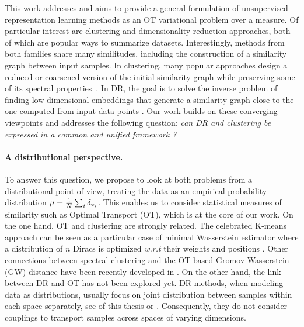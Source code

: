 This work addresses  and aims to provide a general formulation of unsupervised representation learning methods as an OT variational problem over a measure. Of particular interest are clustering and dimensionality reduction approaches, both of which are popular ways to summarize datasets. Interestingly, methods from both families share many similitudes, %
including the construction of a similarity graph between input samples. In clustering, many popular approaches design a reduced or coarsened version of the initial similarity graph while preserving some of its spectral properties~\citep{von2007tutorial, schaeffer2007graph}. 
In DR, the goal is to solve the inverse problem of finding low-dimensional embeddings that generate a similarity graph close to the %
one computed from input data points \citep{ham2004kernel,hinton2002stochastic}.
Our work builds on these converging viewpoints and addresses the following question: \emph{can DR and clustering  be expressed in a common and unified framework ?}

\paragraph{A distributional perspective.} To answer this question, we
propose to look at both problems from a distributional point of view, treating the data as an empirical probability distribution
$\mu=\frac{1}{N}\sum_i\delta_{{\mathbf{x}}_i}$. 
This enables us to consider statistical measures of similarity such as Optimal Transport (OT), which is at the core of our work.
On the one hand, OT and clustering are strongly related.
The celebrated K-means approach can be seen as a particular case of minimal Wasserstein estimator where a distribution of $n$ Diracs is optimized \textit{w.r.t} their weights and positions \citep{Canas12}. Other connections between spectral clustering and the OT-based Gromov-Wasserstein (GW) distance have been recently developed in \citep{chowdhury2021generalized,chen2023gromov,vincent2021semi}. On the other hand, the link between DR and OT has not been explored yet. DR methods, when modeling data as distributions,
usually focus on joint distribution between samples within each space separately, see \eg {} of this thesis or \citep{lu2019doubly}.
Consequently, they do not consider couplings to transport samples across spaces of varying dimensions. %

